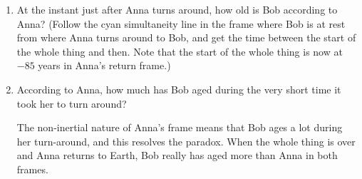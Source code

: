 \begin{enumerate}[wide]
\item At the instant just after Anna turns around, how old is Bob according to Anna?  (Follow the cyan simultaneity line in the frame where Bob is at rest from where Anna turns around to Bob, and get the time between the start of the whole thing and then.  Note that the start of the whole thing is now at $-85$ years in Anna's return frame.)
\answerspace{0.8in}

\item According to Anna, how much has Bob aged during the very short time it took her to turn around?
\answerspace{0.8in}



The non-inertial nature of Anna's frame means that Bob ages a lot during her turn-around, and this resolves the paradox.  When the whole thing is over and Anna returns to Earth, Bob really has aged more than Anna in both frames.



\end{enumerate}
